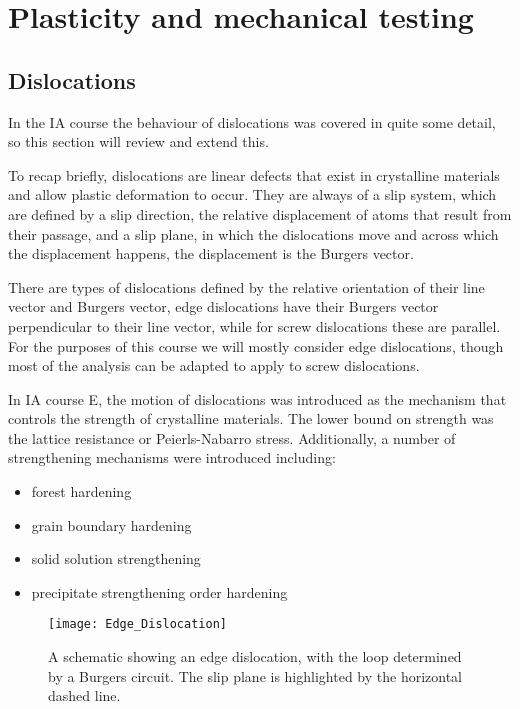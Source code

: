  \section{Plasticity and mechanical testing}
 
 \subsection{Dislocations}
  \FloatBarrier
In the IA course the behaviour of dislocations was covered in quite some detail, so this section will review and extend this.
 
To recap briefly, dislocations are linear defects that exist in crystalline materials and allow plastic deformation to occur. They are always of a slip system, which are defined by a slip direction, the relative displacement of atoms that result from their passage, and a slip plane, in which the dislocations move and across which the displacement happens, the displacement is the Burgers vector.
 
There are types of dislocations defined by the relative orientation of their line vector and Burgers vector, edge dislocations have their Burgers vector perpendicular to their line vector, while for screw dislocations these are parallel. For the purposes of this course we will mostly consider edge dislocations, though most of the analysis can be adapted to apply to screw dislocations.
 
In IA course E, the motion of dislocations was introduced as the mechanism that controls the strength of crystalline materials. The lower bound on strength was the lattice resistance or Peierls-Nabarro stress. Additionally, a number of strengthening mechanisms were introduced including:
\begin{itemize}
\item forest hardening
\item grain boundary hardening
\item solid solution strengthening
\item precipitate strengthening
order hardening
\end{itemize}

\begin{figure}[h!]
\centering
\texttt{[image: Edge\_Dislocation]}
\caption{A schematic showing an edge dislocation, with the loop determined by a Burgers circuit. The slip plane is highlighted by the horizontal dashed line.}
\end{figure}
 
